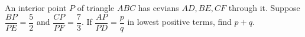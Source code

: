 An interior point $P$ of triangle $ABC$ has cevians $AD,BE,CF$ through it. Suppose $\dfrac{BP}{PE}=\dfrac{5}{2}$ and $\dfrac{CP}{PF}=\dfrac{7}{3}$. If $\dfrac{AP}{PD}=\dfrac{p}{q}$ in lowest positive terms, find $p+q$.
